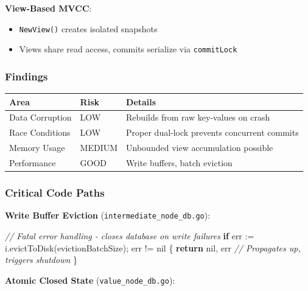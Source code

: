 \documentclass[
]{article}
\newenvironment{Shaded}{}{}
\newcommand{\CommentTok}[1]{\textcolor[rgb]{0.38,0.63,0.69}{\textit{#1}}}
\newcommand{\ControlFlowTok}[1]{\textcolor[rgb]{0.00,0.44,0.13}{\textbf{#1}}}
\newcommand{\NormalTok}[1]{#1}
\newcommand{\OperatorTok}[1]{\textcolor[rgb]{0.40,0.40,0.40}{#1}}
\newcommand{\OtherTok}[1]{\textcolor[rgb]{0.00,0.44,0.13}{#1}}
\newcounter{none} %
\providecommand{\tightlist}{%
  \setlength{\itemsep}{0pt}\setlength{\parskip}{0pt}}
\begin{document}
\textbf{View-Based MVCC}:

\begin{itemize}
\tightlist
\item
  \texttt{NewView()} creates isolated snapshots
\item
  Views share read access, commits serialize via \texttt{commitLock}
\end{itemize}

\subsubsection{Findings}\label{findings-2}

{\def\LTcaptype{none} %
\begin{longtable}[]{@{}lll@{}}
\toprule\noalign{}
Area & Risk & Details \\
\midrule\noalign{}
\endhead
\bottomrule\noalign{}
\endlastfoot
Data Corruption & LOW & Rebuilds from raw key-values on crash \\
Race Conditions & LOW & Proper dual-lock prevents concurrent commits \\
Memory Usage & MEDIUM & Unbounded view accumulation possible \\
Performance & GOOD & Write buffers, batch eviction \\
\end{longtable}
}

\subsubsection{Critical Code Paths}\label{critical-code-paths}

\textbf{Write Buffer Eviction} (\texttt{intermediate\_node\_db.go}):

\begin{Shaded}
\begin{Highlighting}[]
\CommentTok{// Fatal error handling {-} closes database on write failures}
\ControlFlowTok{if}\NormalTok{ err }\OperatorTok{:=}\NormalTok{ i}\OperatorTok{.}\NormalTok{evictToDisk}\OperatorTok{(}\NormalTok{evictionBatchSize}\OperatorTok{);}\NormalTok{ err }\OperatorTok{!=} \OtherTok{nil} \OperatorTok{\{}
    \ControlFlowTok{return} \OtherTok{nil}\OperatorTok{,}\NormalTok{ err  }\CommentTok{// Propagates up, triggers shutdown}
\OperatorTok{\}}
\end{Highlighting}
\end{Shaded}

\textbf{Atomic Closed State} (\texttt{value\_node\_db.go}):
\end{document}
